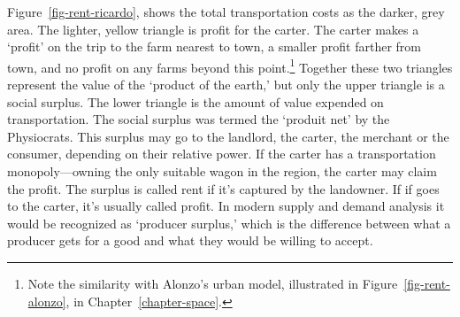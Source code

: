 Figure~\ref{fig-rent-ricardo}, shows the total transportation costs as the darker, grey area. The lighter,  yellow triangle is profit for the carter. The carter makes a `profit' on the trip to the farm nearest to town, a smaller profit farther from town, and no profit on any farms beyond this point.\footnote{Note the similarity with Alonzo's urban model, illustrated in Figure~\ref{fig-rent-alonzo}, in Chapter~\ref{chapter-space}.} 
Together these two triangles represent the  value of the `product of the earth,' but only the upper triangle is a social \gls{surplus}. The lower triangle is the amount of value expended on transportation. The social surplus  was termed the `\gls{produit net}' by the Physiocrats. This surplus may go to the landlord, the carter, the merchant or the consumer, depending %
on their relative power. 
If the carter has a transportation monopoly---owning the only suitable wagon in the region, the carter may claim the profit. The surplus is called rent if it's captured by the landowner. If if goes to the carter, it's usually called profit. In modern supply and demand analysis it would be recognized as `\gls{producer surplus},' which is the difference between what a producer gets for a good and what they would be willing to accept. 



